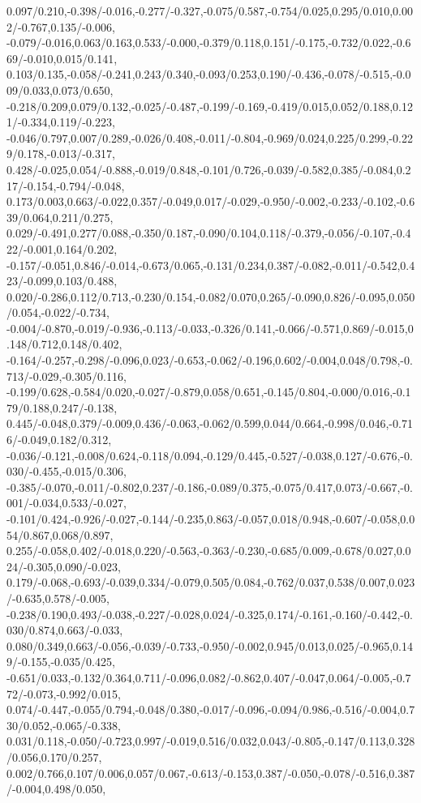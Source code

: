 {0.097/0.210,-0.398/-0.016,-0.277/-0.327,-0.075/0.587,-0.754/0.025,0.295/0.010,0.002/-0.767,0.135/-0.006,%
-0.079/-0.016,0.063/0.163,0.533/-0.000,-0.379/0.118,0.151/-0.175,-0.732/0.022,-0.669/-0.010,0.015/0.141,%
0.103/0.135,-0.058/-0.241,0.243/0.340,-0.093/0.253,0.190/-0.436,-0.078/-0.515,-0.009/0.033,0.073/0.650,%
-0.218/0.209,0.079/0.132,-0.025/-0.487,-0.199/-0.169,-0.419/0.015,0.052/0.188,0.121/-0.334,0.119/-0.223,%
-0.046/0.797,0.007/0.289,-0.026/0.408,-0.011/-0.804,-0.969/0.024,0.225/0.299,-0.229/0.178,-0.013/-0.317,%
0.428/-0.025,0.054/-0.888,-0.019/0.848,-0.101/0.726,-0.039/-0.582,0.385/-0.084,0.217/-0.154,-0.794/-0.048,%
0.173/0.003,0.663/-0.022,0.357/-0.049,0.017/-0.029,-0.950/-0.002,-0.233/-0.102,-0.639/0.064,0.211/0.275,%
0.029/-0.491,0.277/0.088,-0.350/0.187,-0.090/0.104,0.118/-0.379,-0.056/-0.107,-0.422/-0.001,0.164/0.202,%
-0.157/-0.051,0.846/-0.014,-0.673/0.065,-0.131/0.234,0.387/-0.082,-0.011/-0.542,0.423/-0.099,0.103/0.488,%
0.020/-0.286,0.112/0.713,-0.230/0.154,-0.082/0.070,0.265/-0.090,0.826/-0.095,0.050/0.054,-0.022/-0.734,%
-0.004/-0.870,-0.019/-0.936,-0.113/-0.033,-0.326/0.141,-0.066/-0.571,0.869/-0.015,0.148/0.712,0.148/0.402,%
-0.164/-0.257,-0.298/-0.096,0.023/-0.653,-0.062/-0.196,0.602/-0.004,0.048/0.798,-0.713/-0.029,-0.305/0.116,%
-0.199/0.628,-0.584/0.020,-0.027/-0.879,0.058/0.651,-0.145/0.804,-0.000/0.016,-0.179/0.188,0.247/-0.138,%
0.445/-0.048,0.379/-0.009,0.436/-0.063,-0.062/0.599,0.044/0.664,-0.998/0.046,-0.716/-0.049,0.182/0.312,%
-0.036/-0.121,-0.008/0.624,-0.118/0.094,-0.129/0.445,-0.527/-0.038,0.127/-0.676,-0.030/-0.455,-0.015/0.306,%
-0.385/-0.070,-0.011/-0.802,0.237/-0.186,-0.089/0.375,-0.075/0.417,0.073/-0.667,-0.001/-0.034,0.533/-0.027,%
-0.101/0.424,-0.926/-0.027,-0.144/-0.235,0.863/-0.057,0.018/0.948,-0.607/-0.058,0.054/0.867,0.068/0.897,%
0.255/-0.058,0.402/-0.018,0.220/-0.563,-0.363/-0.230,-0.685/0.009,-0.678/0.027,0.024/-0.305,0.090/-0.023,%
0.179/-0.068,-0.693/-0.039,0.334/-0.079,0.505/0.084,-0.762/0.037,0.538/0.007,0.023/-0.635,0.578/-0.005,%
-0.238/0.190,0.493/-0.038,-0.227/-0.028,0.024/-0.325,0.174/-0.161,-0.160/-0.442,-0.030/0.874,0.663/-0.033,%
0.080/0.349,0.663/-0.056,-0.039/-0.733,-0.950/-0.002,0.945/0.013,0.025/-0.965,0.149/-0.155,-0.035/0.425,%
-0.651/0.033,-0.132/0.364,0.711/-0.096,0.082/-0.862,0.407/-0.047,0.064/-0.005,-0.772/-0.073,-0.992/0.015,%
0.074/-0.447,-0.055/0.794,-0.048/0.380,-0.017/-0.096,-0.094/0.986,-0.516/-0.004,0.730/0.052,-0.065/-0.338,%
0.031/0.118,-0.050/-0.723,0.997/-0.019,0.516/0.032,0.043/-0.805,-0.147/0.113,0.328/0.056,0.170/0.257,%
0.002/0.766,0.107/0.006,0.057/0.067,-0.613/-0.153,0.387/-0.050,-0.078/-0.516,0.387/-0.004,0.498/0.050,%
}

